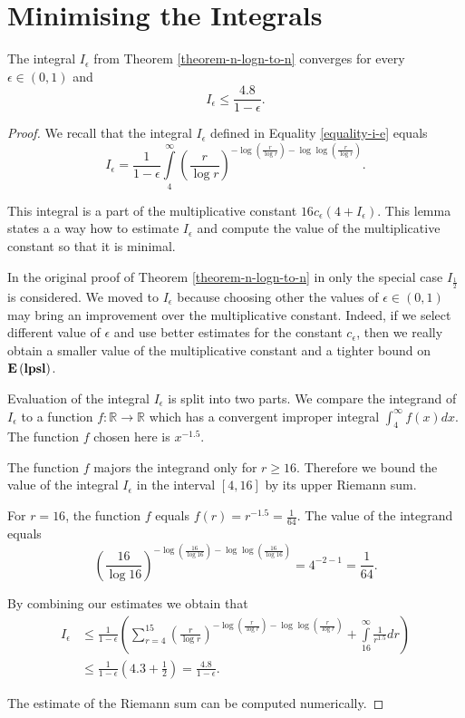\section{Minimising the Integrals}
\label{section-integral-estimate}
\begin{lemma}
\label{lemma-convergent-I-e}
The integral $I_\epsilon$ from Theorem \ref{theorem-n-logn-to-n} converges for every $\epsilon \in (0, 1)$ and
\[
I_\epsilon \leq \frac{4.8}{1 - \epsilon} \text{.}
\]
\end{lemma}
\begin{proof}
We recall that the integral $I_\epsilon$ defined in Equality \ref{equality-i-e} equals
\[
I_{\epsilon} = \frac{1}{1 - \epsilon} \displaystyle\int\limits_4^\infty \left(\frac{r}{\log r}\right)^{-\log \left(\frac{r}{\log r}\right) - \log \log \left(\frac{r}{\log r}\right)} \text{.}
\]

This integral is a part of the multiplicative constant $16c_\epsilon(4 + I_\epsilon)$. This lemma states a a way how to estimate $I_\epsilon$ and compute the value of the multiplicative constant so that it is minimal.

In the original proof of Theorem \ref{theorem-n-logn-to-n} in \cite{DBLP:journals/jacm/AlonDMPT99} only the special case $I_{\frac{1}{2}}$ is considered. We moved to $I_\epsilon$ because choosing other the values of $\epsilon \in (0, 1)$ may bring an improvement over the multiplicative constant. Indeed, if we select different value of $\epsilon$ and use better estimates for the constant $c_\epsilon$, then we really obtain a smaller value of the multiplicative constant and a tighter bound on $\mathbf{E}\left(\mathbf{lpsl}\right)$.

Evaluation of the integral $I_\epsilon$ is split into two parts. We compare the integrand of $I_\epsilon$ to a function $f: \mathbb{R} \rightarrow \mathbb{R}$ which has a convergent improper integral $\int_{4}^{\infty} f(x) dx$. The function $f$ chosen here is $x ^ {-1.5}$. 

The function $f$ majors the integrand only for $r \geq 16$. Therefore we bound the value of the integral $I_\epsilon$ in the interval $[4, 16]$ by its upper Riemann sum.

For $r = 16$, the function $f$ equals $f(r) = r ^ {-1.5} = \frac{1}{64}$.
The value of the integrand equals
\[
	\left(\frac{16}{\log 16}\right)^{-\log \left(\frac{16}{\log 16}\right) - \log \log \left(\frac{16}{\log 16}\right)} = 4^{-2 - 1} = \frac{1}{64} \text{.}
\]

By combining our estimates we obtain that
\[
\begin{split}
I_{\epsilon} 
	& \leq \frac{1}{1 - \epsilon} \left( \displaystyle \sum_{r = 4}^{15} \left(\frac{r}{\log r}\right)^{-\log \left(\frac{r}{\log r}\right) - \log \log \left(\frac{r}{\log r}\right)} + \int\limits_{16}^\infty \frac{1}{r^{1.5}} dr \right) \\
	& \leq \frac{1}{1 - \epsilon} \left(4.3 + \frac{1}{2}\right) = \frac{4.8}{1-\epsilon} \text{.}
\end{split}
\]

The estimate of the Riemann sum can be computed numerically.
\end{proof}

